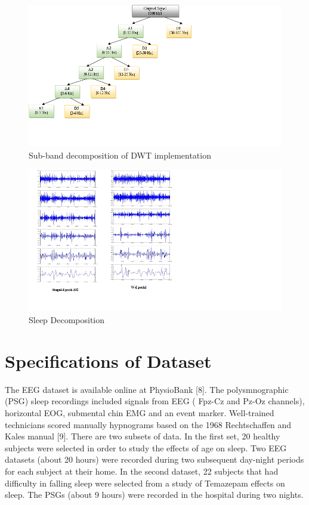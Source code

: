 \documentclass[a4paper, 11pt]{article} %
\begin{document}
\begin{figure}

\includegraphics[width=1\textwidth]{DWT.png}

\caption{Sub-band decomposition of DWT implementation}
\end{figure}
\begin{figure}

\includegraphics[width=1\textwidth]{stages.png}

\caption{Sleep Decomposition}
\end{figure}
\section*{Specifications of Dataset}

The EEG dataset is available online at PhysioBank [8]. The polysmnographic (PSG) sleep recordings included signals from EEG ( Fpz-Cz and Pz-Oz channels), horizontal EOG, submental chin EMG and an event marker. Well-trained technicians scored manually hypnograms based on the 1968 Rechtschaffen and Kales manual [9].
There are two subsets of data. In the first set, 20 healthy subjects were selected in order to study the effects of age on sleep. Two EEG datasets (about 20 hours) were recorded during two subsequent day-night periods for each subject at their home. In the second dataset, 22 subjects that had difficulty in falling sleep were selected from a study of Temazepam effects on sleep. The PSGs (about 9 hours) were recorded in the hospital during two nights.
\end{document}
